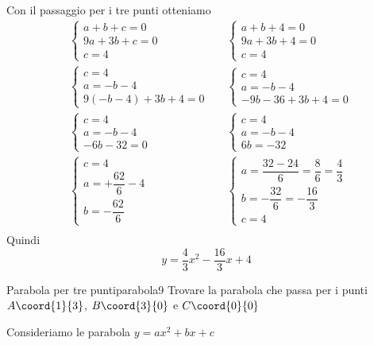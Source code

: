 Con il passaggio per i tre punti otteniamo
\begin{align*}
	&\begin{cases}
		a+b+c=0\\9a+3b+c=0\\c=4
	\end{cases}
	&&\begin{cases}
		a+b+4=0\\9a+3b+4=0\\c=4
	\end{cases}\\
	&\begin{cases}
		c=4\\a=-b-4\\9(-b-4)+3b+4=0
	\end{cases}
	&&\begin{cases}
			c=4\\a=-b-4\\-9b-36+3b+4=0
	\end{cases}\\
	&\begin{cases}
			c=4\\a=-b-4\\-6b-32=0
	\end{cases}
	&&\begin{cases}
		c=4\\a=-b-4\\6b=-32
	\end{cases}\\
	&\begin{cases}
		c=4\\a=+\dfrac{62}{6}-4\\b=-\dfrac{62}{6}
	\end{cases}
	&&\begin{cases}
		a=\dfrac{32-24}{6}=\dfrac{8}{6}=\dfrac{4}{3}\\b=-\dfrac{32}{6}=-\dfrac{16}{3}\\c=4
	\end{cases}\\
\end{align*}
Quindi\[y=\dfrac{4}{3}x^2-\dfrac{16}{3}x+4 \]
\begin{center}
	
	\label{fig:disegnoparabola8}
\end{center}
\begin{esempiot}{Parabola per tre punti}{parabola9}
	Trovare la parabola che passa per i punti $A\coord{1}{3}$, $B\coord{3}{0}$ e $C\coord{0}{0}$
\end{esempiot}
Consideriamo le parabola $y=ax^2+bx+c$

